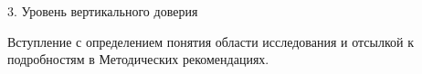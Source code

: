 \begin{frame}{3. Уровень вертикального доверия}

\tiny

Вступление с определением понятия области исследования и отсылкой к подробностям в Методических рекомендациях.

\end{frame}


